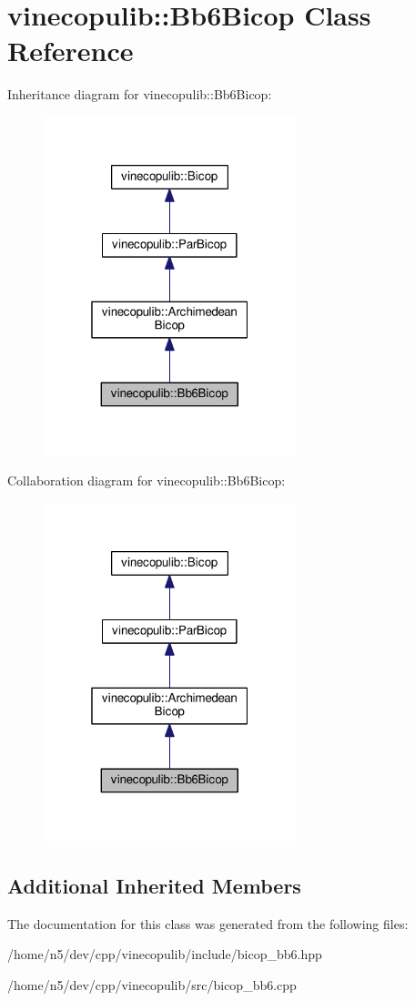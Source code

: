 \hypertarget{classvinecopulib_1_1_bb6_bicop}{}\section{vinecopulib\+:\+:Bb6\+Bicop Class Reference}
\label{classvinecopulib_1_1_bb6_bicop}


Inheritance diagram for vinecopulib\+:\+:Bb6\+Bicop\+:\nopagebreak
\begin{figure}[H]
\begin{center}
\leavevmode
\includegraphics[width=208pt]{classvinecopulib_1_1_bb6_bicop__inherit__graph}
\end{center}
\end{figure}


Collaboration diagram for vinecopulib\+:\+:Bb6\+Bicop\+:\nopagebreak
\begin{figure}[H]
\begin{center}
\leavevmode
\includegraphics[width=208pt]{classvinecopulib_1_1_bb6_bicop__coll__graph}
\end{center}
\end{figure}
\subsection*{Additional Inherited Members}


The documentation for this class was generated from the following files\+:\begin{DoxyCompactItemize}
\item 
/home/n5/dev/cpp/vinecopulib/include/bicop\+\_\+bb6.\+hpp\item 
/home/n5/dev/cpp/vinecopulib/src/bicop\+\_\+bb6.\+cpp\end{DoxyCompactItemize}

